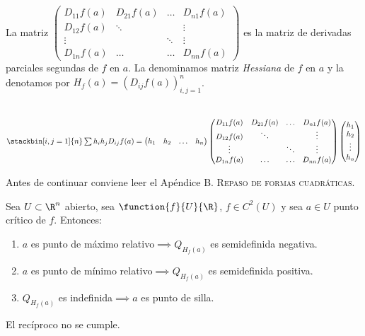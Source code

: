 \begin{defi} La matriz $\begin{pmatrix}
	D_{11}f(a) & D_{21}f(a) & \ldots & D_{n1}f(a)\\ D_{12}f(a)& \ddots & &\vdots\\ \vdots & & \ddots & \vdots\\ D_{1n}f(a)& \ldots & \ldots & D_{nn}f(a)\end{pmatrix}$ es la matriz de derivadas parciales segundas de $f$ en $a$. La denominamos matriz \textit{Hessiana} de $f$ en $a$ y la denotamos por $H_f(a)=(D_{ij}f(a))^n_{i,j=1}$.
\end{defi}

\begin{observacion}\ \\
$\stackbin[i,j=1]{n}\sum h_ih_jD_{ij}f(a)=\begin{pmatrix} h_1 & h_2 &\ldots & h_n\end{pmatrix}
\begin{pmatrix}	D_{11}f(a) & D_{21}f(a) & \ldots & D_{n1}f(a)\\ D_{12}f(a)& \ddots & &\vdots\\ \vdots & & \ddots & \vdots\\ D_{1n}f(a)& \ldots & \ldots & D_{nn}f(a)\end{pmatrix}
\begin{pmatrix} h_1 \\ h_2 \\ \vdots \\ h_n\end{pmatrix}$
\end{observacion}

\begin{nota} Antes de continuar conviene leer el Apéndice \textsc{B. Repaso de formas cuadráticas}.\end{nota}

\begin{proposicion} Sea $U\subset\R^n$ abierto, sea $\function{f}{U}{\R}$, $f\in C^2(U)$ y sea $a\in U$ punto crítico de $f$. Entonces:
\begin{enumerate}[1)]
\item $a$ es punto de máximo relativo$\implies Q_{H_f(a)}$ es semidefinida negativa.
\item $a$ es punto de mínimo relativo$\implies Q_{H_f(a)}$ es semidefinida positiva.
\item $Q_{H_f(a)}$ es indefinida$\implies a$ es punto de silla.
\end{enumerate}
El recíproco no se cumple.
\end{proposicion}

